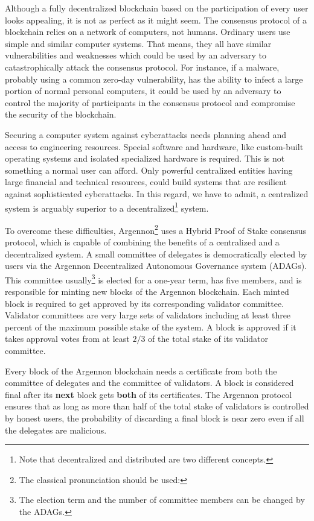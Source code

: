 Although a fully decentralized blockchain based on the participation of every user looks appealing, it is not as perfect
as it might seem. The consensus protocol of a blockchain relies on a network of computers, not humans. Ordinary users
use simple and similar computer systems. That means, they all have similar vulnerabilities and weaknesses which could be
used by an adversary to catastrophically attack the consensus protocol. For instance, if a malware, probably using a
common zero-day
vulnerability, has the ability to infect a large portion of normal personal computers, it could be used by an
adversary to control the majority of participants in the consensus protocol and compromise the security of the
blockchain.

Securing a computer system against cyberattacks needs planning ahead and access to engineering resources.
Special software and hardware, like custom-built operating systems and isolated specialized hardware is required.
This is not something a normal user can afford. Only powerful centralized entities having large financial and
technical resources, could build
systems that are resilient against sophisticated cyberattacks. In this regard, we have to admit, a centralized system is
arguably superior to a decentralized\footnote{Note that decentralized and distributed are two different concepts.}
system.

To overcome these difficulties, Argennon\footnote{The classical pronunciation should be used:}
uses a Hybrid Proof of Stake consensus protocol, which is
capable of combining the benefits of a centralized and a decentralized system. A small committee of
delegates is democratically elected by users via the Argennon Decentralized Autonomous Governance system
(ADAGs). This committee usually\footnote{The election term and the number of committee members can be changed by the
ADAGs.} is elected for a one-year term, has five members, and is responsible for minting new
blocks of the Argennon blockchain.
Each minted block is required to get approved by its corresponding validator committee. Validator committees are very
large sets of validators including at least three percent of the maximum possible stake of the system. A block is
approved if it takes approval votes from at least \(2/3\) of the total stake of its validator committee.

Every block of the Argennon blockchain needs a certificate from both the committee of delegates and
the committee of validators. A block is considered final after its \textbf{next} block gets \textbf{both} of
its certificates. The Argennon protocol ensures that as long as more than half of the total stake of validators is
controlled by honest users, the probability of discarding a final block is near zero even if all the delegates are
malicious.

